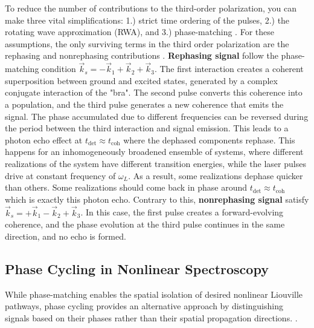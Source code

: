 \noindent 
To reduce the number of contributions to the third-order polarization, you can make three vital simplifications: 1.) strict time ordering of the pulses, 2.) the rotating wave approximation (RWA), and 3.) phase-matching \cite{hamm2005principlesnonlinearoptical,  %
mukamel1995principlesnonlinearoptical, cho2009twodimensionalopticalspectroscopy, jonas2003twodimensionalfemtosecondspectroscopy}.
For these assumptions, the only surviving terms in the third order polarization are the rephasing and nonrephasing contributions \cite{cho2009twodimensionalopticalspectroscopy, jonas2003twodimensionalfemtosecondspectroscopy}.
\textbf{Rephasing signal} follow the phase-matching condition $\vec{k}_s = -\vec{k}_1 + \vec{k}_2 + \vec{k}_3$. The first interaction creates a coherent superposition between ground and excited states, generated by a complex conjugate interaction of the "bra". The second pulse converts this coherence into a population, and the third pulse generates a new coherence that emits the signal. The phase accumulated due to different frequencies can be reversed during the period between the third interaction and signal emission. This leads to a photon echo effect at $t_{\text{det}} \approx t_{\text{coh}}$ where the dephased components rephase.
This happens for an inhomogeneously broadened ensemble of systems, where different realizations of the system have different transition energies, while the laser pulses drive at constant frequency of $\omega_L$. As a result, some realizations dephase quicker than others. Some realizations should come back in phase around $t_{\text{det}} \approx t_{\text{coh}}$ which is exactly this photon echo.
Contrary to this, \textbf{nonrephasing signal} satisfy $\vec{k}_s = +\vec{k}_1 - \vec{k}_2 + \vec{k}_3$. In this case, the first pulse creates a forward-evolving coherence, and the phase evolution at the third pulse continues in the same direction, and no echo is formed.


\subsection{Phase Cycling in Nonlinear Spectroscopy}
\label{subsec:phase_cycling}

\noindent 
While phase-matching enables the spatial isolation of desired nonlinear Liouville pathways, phase cycling provides an alternative approach by distinguishing signals based on their phases rather than their spatial propagation directions. %
\cite{mukamel1995principlesnonlinearoptical, cho2009twodimensionalopticalspectroscopy, jonas2003twodimensionalfemtosecondspectroscopy, brixneretal2004phasestabilizedtwodimensionalelectronic, greenetal2024vibrationalcoherenceshalfbroadband}.

